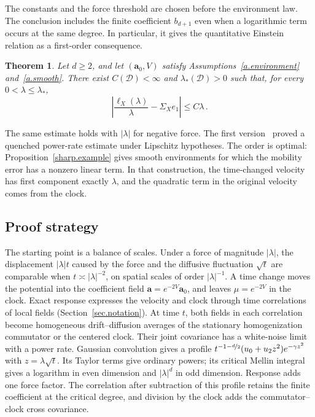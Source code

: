 \documentclass[11pt]{amsart}
\newcommand{\nf}{\nicefrac}
\newtheorem{theorem}[proposition]{Theorem}
\theoremstyle{definition}
\theoremstyle{remark}
\numberwithin{equation}{section}
\renewcommand{\a}{\mathbf a}
\begin{document}
The constants and the force threshold are chosen before the environment law. The conclusion includes the finite coefficient $b_{d+1}$ even when a logarithmic term occurs at the same degree. In particular, it gives the quantitative Einstein relation as a first-order consequence.

\begin{theorem}\label{t.main}
Let $d\geq2$, and let $(\a_0,V)$ satisfy Assumptions~\ref{a.environment} and~\ref{a.smooth}. There exist $C(\mathcal D)<\infty$ and $\lambda_*(\mathcal D)>0$ such that, for every $0<\lambda\leq\lambda_*$,
\begin{equation}\label{eq.main-rate}
 \left|\frac{\ell_X(\lambda)}\lambda-\Sigma_Xe_1\right|
 \leq C\lambda\, .
\end{equation}
\end{theorem}

The same estimate holds with $|\lambda|$ for negative force. The first version~\citep{BouRabeeXu2026v1} proved a quenched power-rate estimate under Lipschitz hypotheses. The order is optimal: Proposition~\ref{sharp.example} gives smooth environments for which the mobility error has a nonzero linear term. In that construction, the time-changed velocity has first component exactly $\lambda$, and the quadratic term in the original velocity comes from the clock.

\subsection{Proof strategy}\label{ss.strategy}

The starting point is a balance of scales. Under a force of magnitude $|\lambda|$, the displacement $|\lambda|t$ caused by the force and the diffusive fluctuation $\sqrt t$ are comparable when $t\asymp|\lambda|^{-2}$, on spatial scales of order $|\lambda|^{-1}$. A time change moves the potential into the coefficient field $\a=e^{-2V}\a_0$, and leaves $\mu=e^{-2V}$ in the clock. Exact response expresses the velocity and clock through time correlations of local fields (Section~\ref{sec.notation}). At time $t$, both fields in each correlation become homogeneous drift--diffusion averages of the stationary homogenization commutator or the centered clock. Their joint covariance has a white-noise limit with a power rate. Gaussian convolution gives a profile $t^{-1-\nf d2}(u_0+u_2z^2)e^{-\gamma z^2}$ with $z=\lambda\sqrt t$. Its Taylor terms give ordinary powers; its critical Mellin integral gives a logarithm in even dimension and $|\lambda|^d$ in odd dimension. Response adds one force factor. The correlation after subtraction of this profile retains the finite coefficient at the critical degree, and division by the clock adds the commutator--clock cross covariance.
\end{document}
